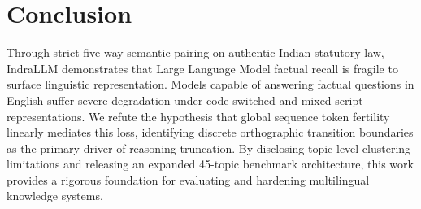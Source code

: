 \documentclass[11pt]{article}
\begin{document}
\section{Conclusion}
\label{sec:conclusion}

Through strict five-way semantic pairing on authentic Indian statutory law, IndraLLM demonstrates that Large Language Model factual recall is fragile to surface linguistic representation. Models capable of answering factual questions in English suffer severe degradation under code-switched and mixed-script representations. We refute the hypothesis that global sequence token fertility linearly mediates this loss, identifying discrete orthographic transition boundaries as the primary driver of reasoning truncation. By disclosing topic-level clustering limitations and releasing an expanded 45-topic benchmark architecture, this work provides a rigorous foundation for evaluating and hardening multilingual knowledge systems.




\clearpage
\appendix



\end{document}
